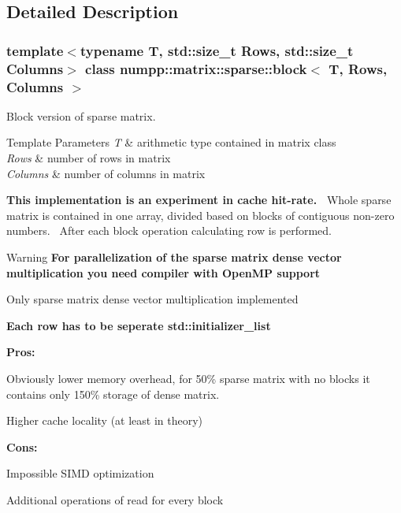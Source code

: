 \subsection{Detailed Description}
\subsubsection*{template$<$typename T, std\+::size\+\_\+t Rows, std\+::size\+\_\+t Columns$>$\newline
class numpp\+::matrix\+::sparse\+::block$<$ T, Rows, Columns $>$}

Block version of sparse matrix. 


\begin{DoxyTemplParams}{Template Parameters}
{\em T} & arithmetic type contained in matrix class \\
\hline
{\em Rows} & number of rows in matrix \\
\hline
{\em Columns} & number of columns in matrix\\
\hline
\end{DoxyTemplParams}
{\bfseries This implementation is an experiment in cache hit-\/rate.~\newline
 } Whole sparse matrix is contained in one array, divided based on blocks of contiguous non-\/zero numbers.~\newline
After each block operation calculating row is performed.

\begin{DoxyWarning}{Warning}
{\bfseries For parallelization of the sparse matrix dense vector multiplication you need compiler with Open\+MP support} 

Only sparse matrix dense vector multiplication implemented 

{\bfseries Each row has to be seperate std\+::initializer\+\_\+list}
\end{DoxyWarning}
{\bfseries Pros\+:}
\begin{DoxyItemize}
\item Obviously lower memory overhead, for 50\% sparse matrix with no blocks it contains only 150\% storage of dense matrix.
\item Higher cache locality (at least in theory)
\end{DoxyItemize}

{\bfseries Cons\+:}
\begin{DoxyItemize}
\item Impossible S\+I\+MD optimization
\item Additional operations of read for every block
\end{DoxyItemize}

